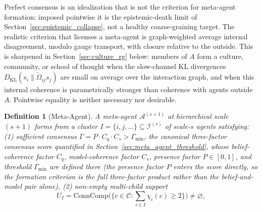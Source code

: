\documentclass[11pt]{article}
\newtheorem{definition}{Definition}
\begin{document}
Perfect consensus is an idealization that is not the criterion for meta-agent formation: imposed pointwise it is the epistemic-death limit of Section~\ref{sec:epistemic_collapse}, not a healthy coarse-graining target. The realistic criterion that licenses a meta-agent is graph-weighted average internal disagreement, modulo gauge transport, with closure relative to the outside. This is sharpened in Section~\ref{sec:culture_rg} below: members of $A$ form a culture, community, or school of thought when the slow-channel KL divergences $D_{\mathrm{KL}}(s_i \| \tilde\Omega_{ij} s_j)$ are small on average over the interaction graph, and when this internal coherence is parametrically stronger than coherence with agents outside $A$. Pointwise equality is neither necessary nor desirable.

\begin{definition}[Meta-Agent]
A meta-agent $\mathcal{A}^{(s+1)}$ at hierarchical scale $(s+1)$ forms from a cluster $I = \{i, j, \ldots\} \subseteq \mathcal{I}^{(s)}$ of scale-$s$ agents satisfying: (1) sufficient consensus $\Gamma = P \cdot C_q \cdot C_s > \Gamma_{\min}$, the canonical three-factor consensus score quantified in Section~\ref{sec:meta_agent_threshold}, whose belief-coherence factor $C_q$, model-coherence factor $C_s$, presence factor $P \in [0, 1]$, and threshold $\Gamma_{\min}$ are defined there (the presence factor $P$ enters the score directly, so the formation criterion is the full three-factor product rather than the belief-and-model pair alone), (2) non-empty multi-child support
\begin{equation}
U_I = \mathrm{ConnComp}\Big(\big\{c \in \mathcal{C}: \textstyle\sum_{i \in I} \chi_i(c) \ge 2\big\}\Big) \neq \varnothing,
\label{eq:meta_agent_support}
\end{equation}

\end{definition}
\end{document}
